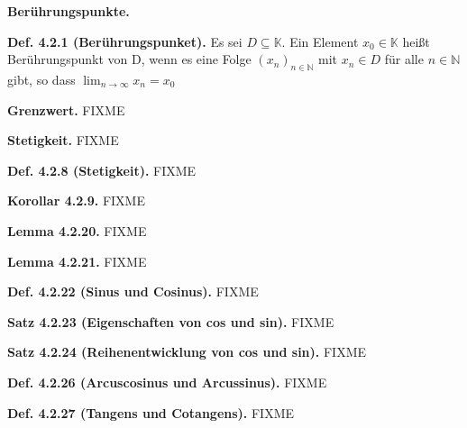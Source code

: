 \textbf{Berührungspunkte.}

\textbf{Def. 4.2.1 (Berührungspunket).} Es sei $D \subseteq \mathbb K$. Ein Element $x_0 \in \mathbb K$ heißt Berührungspunkt von D, wenn es eine Folge $(x_n)_{n \in \mathbb N}$ mit $x_n \in D$ für alle $n \in \mathbb N$ gibt, so dass $\lim_{n \rightarrow \infty} x_n = x_0$

\textbf{Grenzwert.} FIXME

\textbf{Stetigkeit.} FIXME

\textbf{Def. 4.2.8 (Stetigkeit).} FIXME

\textbf{Korollar 4.2.9.} FIXME

\textbf{Lemma 4.2.20.} FIXME

\textbf{Lemma 4.2.21.} FIXME

\textbf{Def. 4.2.22 (Sinus und Cosinus).} FIXME

\textbf{Satz 4.2.23 (Eigenschaften von cos und sin).} FIXME

\textbf{Satz 4.2.24 (Reihenentwicklung von cos und sin).} FIXME

\textbf{Def. 4.2.26 (Arcuscosinus und Arcussinus).} FIXME

\textbf{Def. 4.2.27 (Tangens und Cotangens).} FIXME

